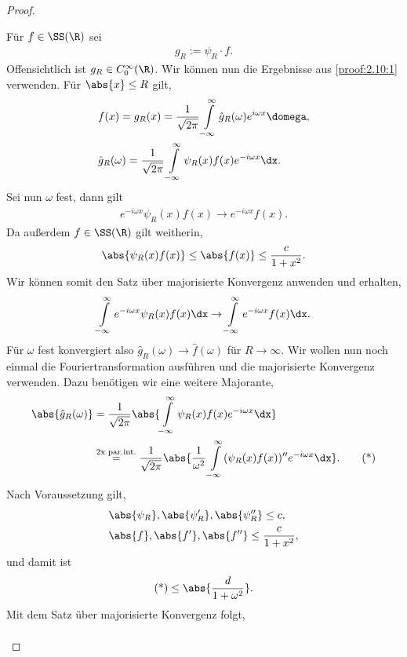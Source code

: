 \begin{proof}
\begin{enumerate}[label=\arabic{*}.)]
Für $f\in\SS(\R)$ sei
\begin{align*}
g_R := \psi_R \cdot f.
\end{align*}
Offensichtlich ist $g_R  \in C_0^\infty(\R)$. Wir können nun die Ergebnisse aus
\ref{proof:2.10:1} verwenden. Für $\abs{x}\le R$ gilt,
\begin{align*}
&f(x) = g_R(x) = \frac{1}{\sqrt{2\pi}}\int\limits_{-\infty}^\infty
\hat{g}_R(\omega)e^{i\omega x}\domega,\\
&\hat{g}_R(\omega) = \frac{1}{\sqrt{2\pi}}\int\limits_{-\infty}^\infty
\psi_R(x)f(x)e^{-i\omega x}\dx.
\end{align*}
Sei nun $\omega$ fest, dann gilt
\begin{align*}
e^{-i\omega x}\psi_R(x)f(x) \to e^{-i\omega x}f(x).
\end{align*}
Da außerdem $f\in\SS(\R)$ gilt weitherin,
\begin{align*}
\abs{\psi_R(x)f(x)} \le \abs{f(x)} \le \frac{c}{1+x^2}.
\end{align*}
Wir können somit den Satz über majorisierte Konvergenz anwenden und erhalten,
\begin{align*}
\int\limits_{-\infty}^\infty e^{-i\omega x}\psi_R(x)f(x)\dx 
\to \int\limits_{-\infty}^\infty e^{-i\omega x}f(x)\dx.
\end{align*}
Für $\omega$ fest konvergiert also $\hat{g}_R(\omega)\to \hat{f}(\omega)$ für
$R\to\infty$. Wir wollen nun noch einmal die Fouriertransformation ausführen
und die majorisierte Konvergenz verwenden. Dazu benötigen wir eine
weitere Majorante,
\begin{align*}
\abs{\hat{g}_R(\omega)} &=
\frac{1}{\sqrt{2\pi}}\abs{\int\limits_{-\infty}^\infty \psi_R(x)f(x)e^{-i\omega
x}\dx}\\ & \overset{\small\text{2x par.int.}}{=}
\frac{1}{\sqrt{2\pi}}\abs{\frac{1}{\omega^2}\int\limits_{-\infty}^\infty
(\psi_R(x)f(x))''e^{-i\omega x}\dx}.\tag{*}
\end{align*}
Nach Voraussetzung gilt,
\begin{align*}
&\abs{\psi_R}, \abs{\psi_R'}, \abs{\psi_R''} \le c,\\
&\abs{f},\abs{f'},\abs{f''} \le \frac{c}{1+x^2},
\end{align*}
und damit ist %
\begin{align*}
(\text{*}) \le \abs{\frac{d}{1+\omega^2}}.
\end{align*}
Mit dem Satz über majorisierte Konvergenz folgt,
\begin{align*}

\end{align*}
\end{enumerate}
\end{proof}
